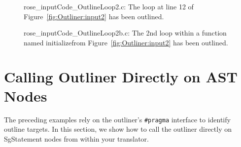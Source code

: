 \begin{figure}[!h]
{\indent
{\mySmallFontSize
\begin{latexonly}
   
\end{latexonly}
\begin{htmlonly}
   
\end{htmlonly}

}
}
\caption{rose\_inputCode\_OutlineLoop2.c: The loop at line 12 of Figure~\ref{fig:Outliner:input2} has been outlined.}
\label{fig:Outliner:output_handle}
\end{figure}

\begin{figure}[!h]
{\indent
{\mySmallFontSize
\begin{latexonly}
   
\end{latexonly}
\begin{htmlonly}
   
\end{htmlonly}

}
}
\caption{rose\_inputCode\_OutlineLoop2b.c: The 2nd loop within a function named initializefrom Figure~\ref{fig:Outliner:input2} has been outlined.}
\label{fig:Outliner:output_handleb}
\end{figure}

\section{Calling Outliner Directly on AST Nodes}
\label{sec:Outliner:direct}

The preceding examples rely on the outliner's \texttt{\#pragma}
interface to identify outline targets. In this section, we show how
to call the outliner directly on SgStatement nodes from within your
translator.


